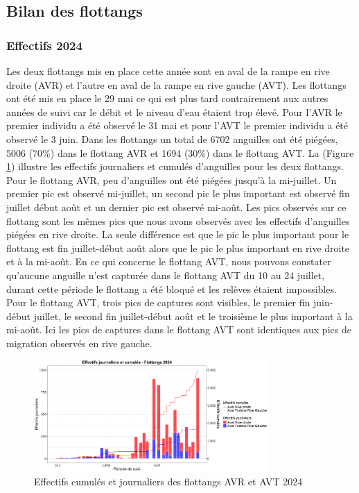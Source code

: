 \documentclass[11pt,titlepage,twoside]{article}\usepackage[]{graphicx}\usepackage[table]{xcolor}
\begin{document}
\subsection{Bilan des flottangs }

\subsubsection{Effectifs 2024}


Les deux flottangs mis en place cette année sont en aval de la rampe en rive droite (AVR) et l’autre en aval de la rampe en rive gauche (AVT). Les flottangs ont été mis en place le 29 mai ce qui est plus tard contrairement aux autres années de suivi car le débit et le niveau d’eau étaient trop élevé. Pour l’AVR le premier individu a été observé le 31 mai et pour l’AVT le premier individu a été observé le 3 juin. Dans les flottangs un total de 6702 anguilles ont été piégées, 5006 (70\%) dans le flottang AVR et 1694 (30\%) dans le flottang AVT. La (Figure \ref{graph_flottang_oral}) illustre les effectifs journaliers et cumulés d'anguilles pour les deux flottangs. Pour le flottang AVR, peu d’anguilles ont été piégées jusqu’à la mi-juillet. Un premier pic est observé mi-juillet, un second pic le plus important est observé fin juillet début août et un dernier pic est observé mi-août. Les pics observés sur ce flottang sont les mêmes pics que nous avons observés avec les effectifs d’anguilles piégées en rive droite. La seule différence est que le pic le plus important pour le flottang est fin juillet-début août alors que le pic le plus important en rive droite et à la mi-août. En ce qui concerne le flottang AVT, nous pouvons constater qu’aucune anguille n’est capturée dans le flottang AVT du 10 au 24 juillet, durant cette période le flottang a été bloqué et les relèves étaient impossibles. Pour le flottang AVT, trois pics de captures sont visibles, le premier fin juin-début juillet, le second fin juillet-début août et le troisième le plus important à la mi-août. Ici les pics de captures dans le flottang AVT sont identiques aux pics de migration observés en rive gauche.


\begin{figure}[htpb]
\centering
\includegraphics[width=0.8\textwidth]{graph_flottang_oral.png}
\caption{Effectifs cumulés et journaliers des flottangs AVR et AVT 2024}
\label{graph_flottang_oral}
\end{figure} 
\end{document}
